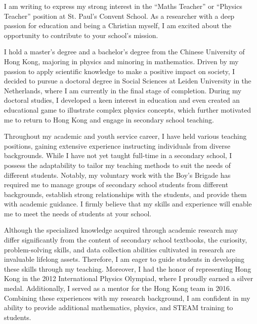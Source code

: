 \documentclass[11pt, a4paper]{awesome-cv}
\begin{document}
\makecvheader[R]

\makecvfooter
  {}%
  {}%
  {}

\makelettertitle

\begin{cvletter}

I am writing to express my strong interest in the ``Maths Teacher'' or ``Physics Teacher'' position at St. Paul's Convent School. As a researcher with a deep passion for education and being a Christian myself, I am excited about the opportunity to contribute to your school's mission.

I hold a master's degree and a bachelor's degree from the Chinese University of Hong Kong, majoring in physics and minoring in mathematics. Driven by my passion to apply scientific knowledge to make a positive impact on society, I decided to pursue a doctoral degree in Social Sciences at Leiden University in the Netherlands, where I am currently in the final stage of completion. During my doctoral studies, I developed a keen interest in education and even created an educational game to illustrate complex physics concepts, which further motivated me to return to Hong Kong and engage in secondary school teaching.

Throughout my academic and youth service career, I have held various teaching positions, gaining extensive experience instructing individuals from diverse backgrounds. While I have not yet taught full-time in a secondary school, I possess the adaptability to tailor my teaching methods to suit the needs of different students. Notably, my voluntary work with the Boy's Brigade has required me to manage groups of secondary school students from different backgrounds, establish strong relationships with the students, and provide them with academic guidance. I firmly believe that my skills and experience will enable me to meet the needs of students at your school.

Although the specialized knowledge acquired through academic research may differ significantly from the content of secondary school textbooks, the curiosity, problem-solving skills, and data collection abilities cultivated in research are invaluable lifelong assets. Therefore, I am eager to guide students in developing these skills through my teaching. Moreover, I had the honor of representing Hong Kong in the 2012 International Physics Olympiad, where I proudly earned a silver medal. Additionally, I served as a mentor for the Hong Kong team in 2016. Combining these experiences with my research background, I am confident in my ability to provide additional mathematics, physics, and STEAM training to students.


\end{cvletter}
\end{document}
